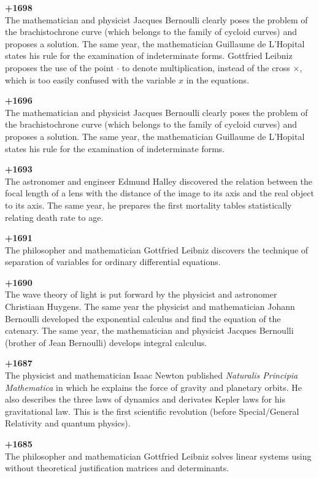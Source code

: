 \textbf{+1698}\\
The mathematician and physicist Jacques Bernoulli clearly poses the problem of the brachistochrone curve (which belongs to the family of cycloid curves) and proposes a solution. The same year, the mathematician Guillaume de L'Hopital states his rule for the examination of indeterminate forms. Gottfried Leibniz proposes the use of the point $\cdot$ to denote multiplication, instead of the cross $\times$, which is too easily confused with the variable $x$ in the equations.

\textbf{+1696}\\
The mathematician and physicist Jacques Bernoulli clearly poses the problem of the brachistochrone curve (which belongs to the family of cycloid curves) and proposes a solution. The same year, the mathematician Guillaume de L'Hopital states his rule for the examination of indeterminate forms.

\textbf{+1693}\\
The astronomer and engineer Edmund Halley discovered the relation between the focal length of a lens with the distance of the image to its axis and the real object to its axis. The same year, he prepares the first mortality tables statistically relating death rate to age.

\textbf{+1691}\\
The philosopher and mathematician Gottfried Leibniz discovers the technique of separation of variables for ordinary differential equations.

\textbf{+1690}\\
The wave theory of light is put forward by the physicist and astronomer Christiaan Huygens. The same year the physicist and mathematician Johann Bernoulli developed the exponential calculus and find the equation of the catenary. The same year, the mathematician and physicist Jacques Bernoulli (brother of Jean Bernoulli) develops integral calculus.

\textbf{+1687}\\
The physicist and mathematician Isaac Newton published \textit{Naturalis Principia Mathematica} in which he explains the force of gravity and planetary orbits. He also describes the three laws of dynamics and derivates Kepler laws for his gravitational law. This is the first scientific revolution (before Special/General Relativity and quantum physics).

\textbf{+1685}\\
The philosopher and mathematician Gottfried Leibniz solves linear systems using without theoretical justification matrices and determinants.

